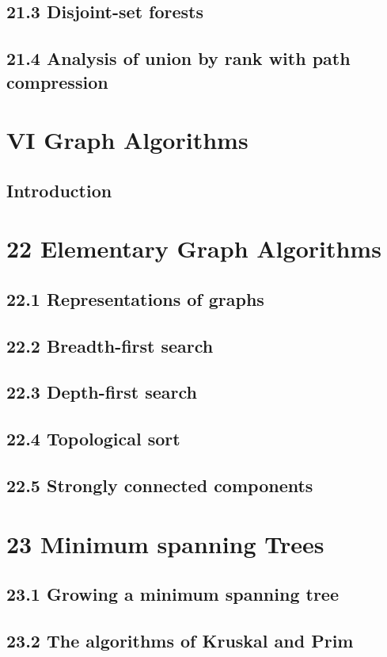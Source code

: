 \documentclass[a4paper]{article}
\begin{document}
\subsection{21.3 Disjoint-set forests}
\subsection{21.4 Analysis of union by rank with path compression}

\newpage
\section*{VI Graph Algorithms}
\subsection*{Introduction}

\newpage
\section{22 Elementary Graph Algorithms}
\subsection{22.1 Representations of graphs}
\subsection{22.2 Breadth-first search}
\subsection{22.3 Depth-first search}
\subsection{22.4 Topological sort}
\subsection{22.5 Strongly connected components}

\newpage
\section{23 Minimum spanning Trees}
\subsection{23.1 Growing a minimum spanning tree}
\subsection{23.2 The algorithms of Kruskal and Prim}
\end{document}
